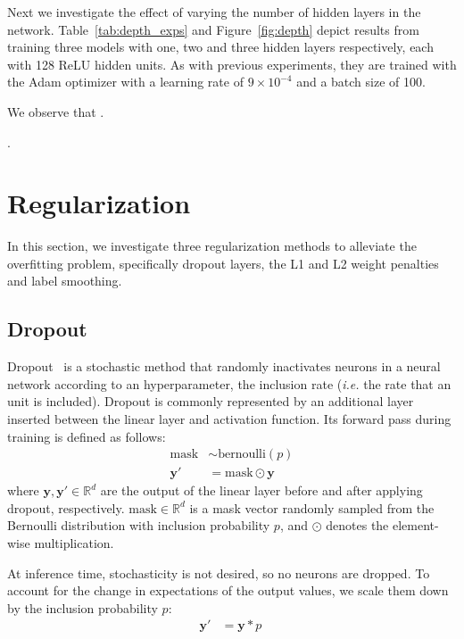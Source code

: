 \documentclass{article}
\begin{document}

Next we investigate the effect of varying the number of hidden layers in the network. 
Table~\ref{tab:depth_exps} and Figure~\ref{fig:depth} depict results from training three models with one, two and three hidden layers respectively, each with 128 ReLU hidden units. 
As with previous experiments, they are trained with the Adam optimizer with a learning rate of $9 \times 10^{-4}$ and a batch size of 100. 

We observe that \questionFour.

\questionFive.




\section{Regularization}
\label{sec:task2.1} 

In this section, we investigate three regularization methods to alleviate the overfitting problem, specifically dropout layers, the L1 and L2 weight penalties and label smoothing.


\subsection{Dropout}

Dropout~\cite{srivastava2014dropout} is a stochastic method that randomly inactivates neurons in a neural network according to an hyperparameter, the inclusion rate  (\textit{i.e.} the rate that an unit is included).
Dropout is commonly represented by an additional layer inserted between the linear layer and activation function.
Its forward pass during training is defined as follows:
\begin{align}
    \text{mask} &\sim \text{bernoulli}(p)\\
    \bm{y}' &= \text{mask} \odot \bm{y}\
\end{align}
where $\bm{y}, \bm{y}' \in \mathbb{R}^d$ are the output of the linear layer before and after applying dropout, respectively. 
$\text{mask} \in \mathbb{R}^d$ is a mask vector randomly sampled from the Bernoulli distribution with inclusion probability $p$, and $\odot$ denotes the element-wise multiplication.

At inference time, stochasticity is not desired, so no neurons are dropped. 
To account for the change in expectations of the output values, we scale them down by the inclusion probability $p$:
\begin{align}
    \bm{y}' &= \bm{y}*p\
\end{align}
\end{document}
